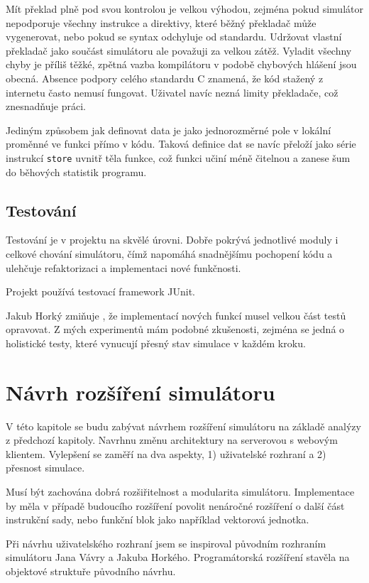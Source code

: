 Mít překlad plně pod svou kontrolou je velkou výhodou, zejména pokud simulátor nepodporuje všechny instrukce a direktivy, které běžný překladač může vygenerovat, nebo pokud se syntax odchyluje od standardu.
Udržovat vlastní překladač jako součást simulátoru ale považuji za velkou zátěž.
Vyladit všechny chyby je příliš těžké, zpětná vazba kompilátoru v podobě chybových hlášení jsou obecná.
Absence podpory celého standardu C znamená, že kód stažený z internetu často nemusí fungovat.
Uživatel navíc nezná limity překladače, což znesnadňuje práci.

Jediným způsobem jak definovat data je jako jednorozměrné pole v lokální proměnné ve funkci přímo v kódu.
Taková definice dat se navíc přeloží jako série instrukcí \texttt{store} uvnitř těla funkce, což funkci učiní méně čitelnou a zanese šum do běhových statistik programu.

\section{Testování}

Testování je v projektu na skvělé úrovni.
Dobře pokrývá jednotlivé moduly i celkové chování simulátoru, čímž napomáhá snadnějšímu pochopení kódu a ulehčuje refaktorizaci a implementaci nové funkčnosti.

Projekt používá testovací framework JUnit. %

Jakub Horký zmiňuje \cite{horkySim}, že implementací nových funkcí musel velkou část testů opravovat.
Z mých experimentů mám podobné zkušenosti, zejména se jedná o holistické testy, které vynucují přesný stav simulace v každém kroku. 

\chapter{Návrh rozšíření simulátoru}

V této kapitole se budu zabývat návrhem rozšíření simulátoru na základě analýzy z předchozí kapitoly.
Navrhnu změnu architektury na serverovou s webovým klientem.
Vylepšení se zaměří na dva aspekty, 1) uživatelské rozhraní a 2) přesnost simulace.

Musí být zachována dobrá rozšiřitelnost a modularita simulátoru.
Implementace by měla v případě budoucího rozšíření povolit nenáročné rozšíření o další část instrukční sady, nebo funkční blok jako například vektorová jednotka.

Při návrhu uživatelského rozhraní jsem se inspiroval původním rozhraním simulátoru Jana Vávry a Jakuba Horkého.
Programátorská rozšíření stavěla na objektové struktuře původního návrhu.


